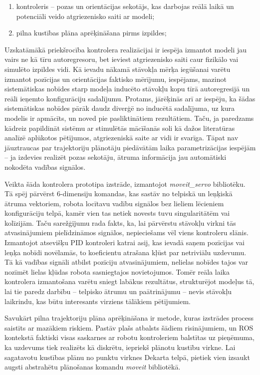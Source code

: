 \documentclass[12pt, a4paper]{article}
\numberwithin{equation}{section} %
\begin{document}
\begin{enumerate}
    \item kontroleris -- pozas un orientācijas sekotājs, kas darbojas reālā laikā un potenciāli veido atgriezenisko saiti ar modeli;
    \item pilna kustības plāna aprēķināšana pirms izpildes;
\end{enumerate}

Uzskatāmākā priekšrocība kontrolera realizācijai ir iespēja izmantot modeli jau vairs ne kā tīru autoregresoru, bet ieviest atgriezenisko saiti caur fizikālo vai simulēto izpildes vidi. Kā ievadu nākamā stāvokļa mērķa iegūšanai varētu izmantot pozīcijas un orientācijas faktisko mērījumu, iespējams, mazinot sistemātiskas nobīdes starp modeļa inducēto stāvokļu kopu tīrā autoregresijā un reāli ieņemto konfigurāciju sadalījumu. Protams, jārēķinās arī ar iespēju, ka šādas sistemātiskas nobīdes pārāk daudz diverģē no inducētā sadalījuma, uz kura modelis ir apmācīts, un noved pie pasliktinātiem rezultātiem. Taču, ja paredzams kādreiz papildināt sistēmu ar stimulētās mācīšanās soli kā dažos literatūras analīzē aplūkotos pētījumos, atgriezeniskā saite ar vidi ir svarīga. Tāpat nav jāuztraucas par trajektoriju plānotāju piedāvātām laika parametrizācijas iespējām -- ja izdevies realizēt pozas sekotāju, ātruma informācija jau automātiski nokodēta vadības signālos.

Veikta šāda kontrolera prototipa izstrāde, izmantojot \textit{moveit\_servo} bibliotēku. Tā spēj pārvērst 6-dimensiju komandas, kas sastāv no telpiskā un leņķiskā ātruma vektoriem, robota locītavu vadību signālos bez lieliem lēcieniem konfigurāciju telpā, kamēr vien tas netiek novests tuvu singularitātēm vai kolīzijām. Taču sarežģījumu rada fakts, ka, lai pārvērstu stāvokļu virkni tās atvasinājumiem pielīdzināmos signālos, nepieciešams vēl viens kontroleru slānis. Izmantojot atsevišķu PID kontroleri katrai asij, kas ievadā saņem pozīcijas vai leņķa nobīdi novēlamās, to koeficientu atrašana kļūst par netriviālu uzdevumu. Tā kā vadības signāli atbilst pozīciju atvasinājumiem, nelielas nobīdes tajos var nozīmēt lielas kļūdas robota sasniegtajos novietojumos. Tomēr reāla laika kontrolera izmantošana varētu sniegt labākus rezultātus, strukturējot modeļus tā, lai tie paredz darbību -- telpisko ātrumu un paātrinājumu -- nevis stāvokļu laikrindu, kas būtu interesants virziens tālākiem pētījumiem.

Savukārt pilna trajektoriju plāna aprēķināšana ir metode, kuras izstrādes process saistīts ar mazākiem riskiem. Pastāv plašs atbalsts šādiem risinājumiem, un ROS kontekstā faktiski visas saskarnes ar robotu kontroleriem balstītas uz pieņēmuma, ka uzdevums tiek realizēts kā diskrētu, iepriekš plānotu kustību virkne. Lai sagatavotu kustības plānu no punktu virknes Dekarta telpā, pietiek vien izsaukt augsti abstrahētu plānošanas komandu \textit{moveit} bibliotēkā. 
\end{document}
